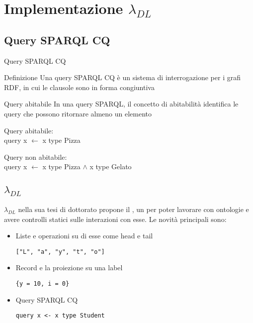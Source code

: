\section{Implementazione $\lambda_{DL}$}
\subsection{Query SPARQL CQ}
\begin{frame}{Query SPARQL CQ}
    \begin{block}{Definizione}
        Una query SPARQL CQ è un sistema di interrogazione per i grafi RDF, in cui le clausole sono in forma congiuntiva
    \end{block}
    \begin{block}{Query abitabile}
        In una query SPARQL, il concetto di abitabilità identifica
le query che possono ritornare almeno un elemento
    \end{block}
    
    \begin{example}
        Query abitabile: \\
        query x $\leftarrow$ x type Pizza
    \end{example}
    \begin{example}
        Query non abitabile: \\
        query x $\leftarrow$ x type Pizza $\land$ x type Gelato
    \end{example}
 
\end{frame}

\subsection{$\lambda_{DL}$}
\begin{frame}[containsverbatim]{$\lambda_{DL}$}
 nella sua tesi di dottorato propone il , un 
per poter lavorare con ontologie e avere controlli statici sulle interazioni con esse. Le novit\`a principali sono:
\begin{itemize}
\item Liste e operazioni su di esse come head e tail
\begin{example}
\begin{verbatim}
["L", "a", "y", "t", "o"]
\end{verbatim}
\end{example}
\item Record e la proiezione su una label
\begin{example}
\begin{verbatim}
{y = 10, i = 0}
\end{verbatim}
\end{example}
\item Query SPARQL CQ
\begin{example}
\begin{verbatim}
query x <- x type Student
\end{verbatim}
\end{example}
\end{itemize}
\end{frame}

